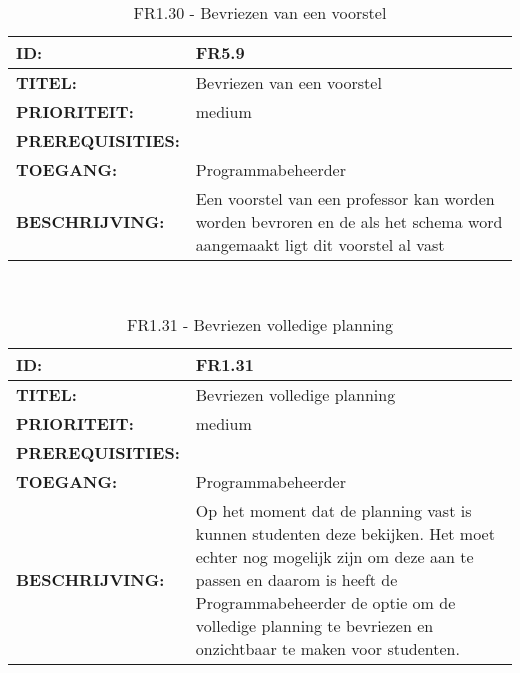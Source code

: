 \noindent\begin{table}[H]
            \begin{tabular}{l | p{10cm}}
                \textbf{ID:} & FR5.9 \\ \hline
                \textbf{TITEL:} & Bevriezen van een voorstel\\ \hline
                \textbf{PRIORITEIT:} &  medium \\ \hline
                \textbf{PREREQUISITIES:} & \\ \hline
                \textbf{TOEGANG:} & Programmabeheerder \\ \hline
                \textbf{BESCHRIJVING:} & Een voorstel van een professor kan worden worden bevroren en de als het schema word aangemaakt ligt dit voorstel al vast\\ 
            \end{tabular}\\
            \caption{FR1.30 - Bevriezen van een voorstel}
            \label{tab:FR1.30 - Bevriezen van een voorstel}
        \end{table}
        
\noindent\begin{table}[H]
            \begin{tabular}{l | p{10cm}}
                \textbf{ID:} & FR1.31 \\ \hline
                \textbf{TITEL:} & Bevriezen volledige planning\\ \hline
                \textbf{PRIORITEIT:} &  medium \\ \hline
                \textbf{PREREQUISITIES:} & \\ \hline
                \textbf{TOEGANG:} & Programmabeheerder \\ \hline
                \textbf{BESCHRIJVING:} & Op het moment dat de planning vast is kunnen studenten deze bekijken. Het moet echter nog mogelijk zijn om deze aan te passen en daarom is heeft de Programmabeheerder de optie om de volledige planning te bevriezen en onzichtbaar te maken voor studenten.\\ 
            \end{tabular}\\
            \caption{FR1.31 - Bevriezen volledige planning}
            \label{tab:FR1.31 - Bevriezen volledige planning}
        \end{table}   
\clearpage